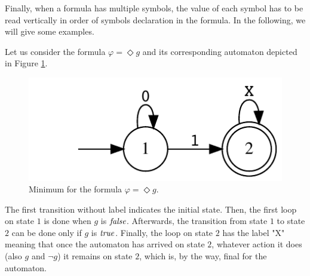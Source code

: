 Finally, when a formula has multiple symbols, the value of each symbol has to be read vertically in order of symbols declaration in the formula. In the following, we will give some examples.

\begin{example}
Let us consider the formula $\varphi = \Diamond g$ and its corresponding automaton depicted in Figure \ref{fig:automa-example1}.
\begin{figure}[h]
\centering
\includegraphics{images/example1-output.eps}
\caption{Minimum \DFA for the formula $\varphi = \Diamond g$.} 
\label{fig:automa-example1}
\end{figure}
The first transition without label indicates the initial state. Then, the first loop on state $1$ is done when $g$ is $\mathit{false}$. Afterwards, the transition from state $1$ to state $2$ can be done only if $g$ is $\mathit{true}$. Finally, the loop on state $2$ has the label "X" meaning that once the automaton has arrived on state $2$, whatever action it does (also $g$ and $\lnot g$) it remains on state $2$, which is, by the way, final for the automaton.
\end{example}

